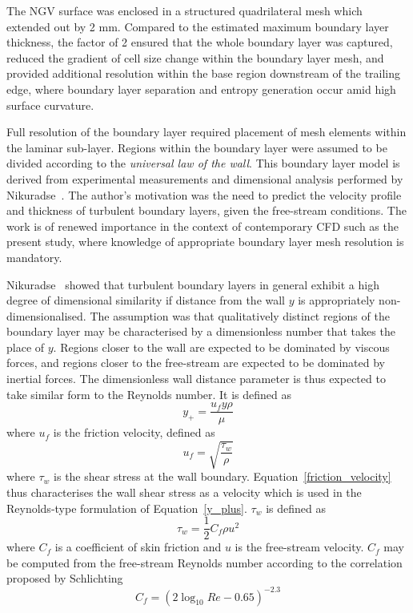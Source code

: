 \documentclass[a4paper, 11pt, oneside]{report}
\begin{document}
The NGV surface was enclosed in a structured quadrilateral mesh which extended out by 2 mm. Compared to the estimated maximum boundary layer thickness, the factor of 2 ensured that the whole boundary layer was captured, reduced the gradient of cell size change within the boundary layer mesh, and provided additional resolution within the base region downstream of the trailing edge, where boundary layer separation and entropy generation occur amid high surface curvature.

Full resolution of the boundary layer required placement of mesh elements within the laminar sub-layer. Regions within the boundary layer were assumed to be divided according to the \textit{universal law of the wall}. This boundary layer model is derived from experimental measurements and dimensional analysis performed by Nikuradse~\cite{nikuradse_boundary_layers}. The author's motivation was the need to predict the velocity profile and thickness of turbulent boundary layers, given the free-stream conditions. The work is of renewed importance in the context of contemporary CFD such as the present study, where knowledge of appropriate boundary layer mesh resolution is mandatory. 

Nikuradse~\cite{nikuradse_boundary_layers} showed that turbulent boundary layers in general exhibit a high degree of dimensional similarity if distance from the wall $y$ is appropriately non-dimensionalised. The assumption was that qualitatively distinct regions of the boundary layer may be characterised by a dimensionless number that takes the place of $y$. Regions closer to the wall are expected to be dominated by viscous forces, and regions closer to the free-stream are expected to be dominated by inertial forces. The dimensionless wall distance parameter is thus expected to take similar form to the Reynolds number. It is defined as
\begin{equation}\label{y_plus}
y_+ =
\frac{u_f y \rho}{\mu} 
\end{equation}
where $u_f$ is the friction velocity, defined as
\begin{equation}\label{friction_velocity}
u_f = 
\sqrt{
	\frac{\tau_w}{\rho}
}
\end{equation}
where $\tau_w$ is the shear stress at the wall boundary. Equation~\ref{friction_velocity} thus characterises the wall shear stress as a velocity which is used in the Reynolds-type formulation of Equation~\ref{y_plus}. $\tau_w$ is defined as
\begin{equation}\label{wall_shear_stress_definition}
\tau_w =
\frac{1}{2}
C_f
\rho
u^2
\end{equation}
where $C_f$ is a coefficient of skin friction and $u$ is the free-stream velocity. $C_f$ may be computed from the free-stream Reynolds number according to the correlation proposed by Schlichting~\cite{schlichting_boundary_layer_theory}
\begin{equation}
C_f =
\left(
	2
	\log_{10}
	Re
	-
	0.65
\right)^{-2.3}
\end{equation}
\end{document}
